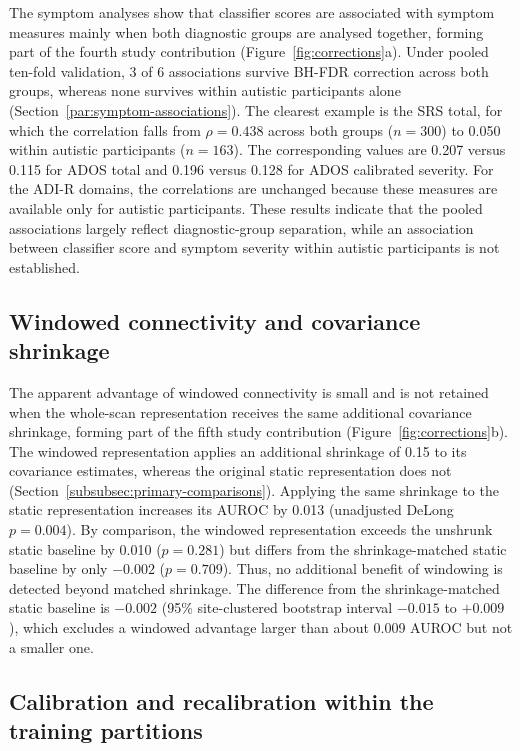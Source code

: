 The symptom analyses show that classifier scores are associated with symptom measures mainly when both diagnostic groups are analysed together, forming part of the fourth study contribution (Figure~\ref{fig:corrections}a). Under pooled ten-fold validation, 3 of 6 associations survive BH-FDR correction across both groups, whereas none survives within autistic participants alone (Section~\ref{par:symptom-associations}). The clearest example is the SRS total, for which the correlation falls from $\rho=0.438$ across both groups ($n=300$) to 0.050 within autistic participants ($n=163$). The corresponding values are 0.207 versus 0.115 for ADOS total and 0.196 versus 0.128 for ADOS calibrated severity. For the ADI-R domains, the correlations are unchanged because these measures are available only for autistic participants. These results indicate that the pooled associations largely reflect diagnostic-group separation, while an association between classifier score and symptom severity within autistic participants is not established.

\subsection{Windowed connectivity and covariance shrinkage}
\label{subsec:results-windowed-shrinkage}

The apparent advantage of windowed connectivity is small and is not retained when the whole-scan representation receives the same additional covariance shrinkage, forming part of the fifth study contribution (Figure~\ref{fig:corrections}b). The windowed representation applies an additional shrinkage of 0.15 to its covariance estimates, whereas the original static representation does not (Section~\ref{subsubsec:primary-comparisons}). Applying the same shrinkage to the static representation increases its AUROC by 0.013 (unadjusted DeLong $p=0.004$). By comparison, the windowed representation exceeds the unshrunk static baseline by 0.010 ($p=0.281$) but differs from the shrinkage-matched static baseline by only $-0.002$ ($p=0.709$). Thus, no additional benefit of windowing is detected beyond matched shrinkage. The difference from the shrinkage-matched static baseline is $-0.002$ (95\% site-clustered bootstrap interval $-0.015$ to $+0.009$), which excludes a windowed advantage larger than about 0.009 AUROC but not a smaller one.

\subsection{Calibration and recalibration within the training partitions}
\label{subsec:results-calibration}

